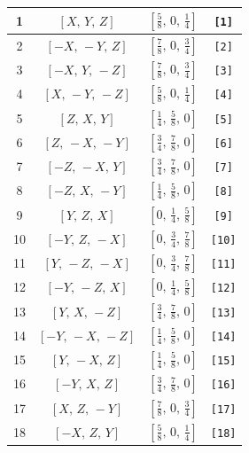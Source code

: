\documentclass[fleqn,8pt]{jsarticle}
\begin{document}
\begin{longtable}{cccc}
1 & $\left[ X,\, Y,\, Z \right]$ & $\left[ \frac{5}{8},\, 0,\, \frac{1}{4} \right]$ & {\tt [1]} \\ \hline
2 & $\left[ - X,\, - Y,\, Z \right]$ & $\left[ \frac{7}{8},\, 0,\, \frac{3}{4} \right]$ & {\tt [2]} \\ \hline
3 & $\left[ - X,\, Y,\, - Z \right]$ & $\left[ \frac{7}{8},\, 0,\, \frac{3}{4} \right]$ & {\tt [3]} \\ \hline
4 & $\left[ X,\, - Y,\, - Z \right]$ & $\left[ \frac{5}{8},\, 0,\, \frac{1}{4} \right]$ & {\tt [4]} \\ \hline
5 & $\left[ Z,\, X,\, Y \right]$ & $\left[ \frac{1}{4},\, \frac{5}{8},\, 0 \right]$ & {\tt [5]} \\ \hline
6 & $\left[ Z,\, - X,\, - Y \right]$ & $\left[ \frac{3}{4},\, \frac{7}{8},\, 0 \right]$ & {\tt [6]} \\ \hline
7 & $\left[ - Z,\, - X,\, Y \right]$ & $\left[ \frac{3}{4},\, \frac{7}{8},\, 0 \right]$ & {\tt [7]} \\ \hline
8 & $\left[ - Z,\, X,\, - Y \right]$ & $\left[ \frac{1}{4},\, \frac{5}{8},\, 0 \right]$ & {\tt [8]} \\ \hline
9 & $\left[ Y,\, Z,\, X \right]$ & $\left[ 0,\, \frac{1}{4},\, \frac{5}{8} \right]$ & {\tt [9]} \\ \hline
10 & $\left[ - Y,\, Z,\, - X \right]$ & $\left[ 0,\, \frac{3}{4},\, \frac{7}{8} \right]$ & {\tt [10]} \\ \hline
11 & $\left[ Y,\, - Z,\, - X \right]$ & $\left[ 0,\, \frac{3}{4},\, \frac{7}{8} \right]$ & {\tt [11]} \\ \hline
12 & $\left[ - Y,\, - Z,\, X \right]$ & $\left[ 0,\, \frac{1}{4},\, \frac{5}{8} \right]$ & {\tt [12]} \\ \hline
13 & $\left[ Y,\, X,\, - Z \right]$ & $\left[ \frac{3}{4},\, \frac{7}{8},\, 0 \right]$ & {\tt [13]} \\ \hline
14 & $\left[ - Y,\, - X,\, - Z \right]$ & $\left[ \frac{1}{4},\, \frac{5}{8},\, 0 \right]$ & {\tt [14]} \\ \hline
15 & $\left[ Y,\, - X,\, Z \right]$ & $\left[ \frac{1}{4},\, \frac{5}{8},\, 0 \right]$ & {\tt [15]} \\ \hline
16 & $\left[ - Y,\, X,\, Z \right]$ & $\left[ \frac{3}{4},\, \frac{7}{8},\, 0 \right]$ & {\tt [16]} \\ \hline
17 & $\left[ X,\, Z,\, - Y \right]$ & $\left[ \frac{7}{8},\, 0,\, \frac{3}{4} \right]$ & {\tt [17]} \\ \hline
18 & $\left[ - X,\, Z,\, Y \right]$ & $\left[ \frac{5}{8},\, 0,\, \frac{1}{4} \right]$ & {\tt [18]} \\ \hline

\end{longtable}
\end{document}
